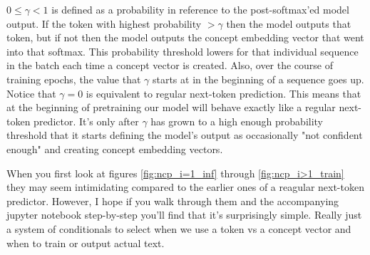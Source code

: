 \documentclass{article}
\begin{document}
$0\leq\gamma<1$ is defined as a probability in reference to the post-softmax'ed model output.
If the token with highest probability $>\gamma$ then the model outputs that token, but if not then the model outputs the concept embedding vector that went into that softmax.
This probability threshold lowers for that individual sequence in the batch each time a concept vector is created.
Also, over the course of training epochs, the value that $\gamma$ starts at in the beginning of a sequence goes up.
Notice that $\gamma=0$ is equivalent to regular next-token prediction.
This means that at the beginning of pretraining our model will behave exactly like a regular next-token predictor.
It's only after $\gamma$ has grown to a high enough probability threshold that it starts defining the model's output as occasionally "not confident enough" and creating concept embedding vectors.\par

When you first look at figures \ref{fig:ncp_i=1_inf} through \ref{fig:ncp_i>1_train} they may seem intimidating compared to the earlier ones of a reagular next-token predictor. However, I hope if you walk through them and the accompanying jupyter notebook step-by-step you'll find that it's surprisingly simple. Really just a system of conditionals to select when we use a token vs a concept vector and when to train or output actual text. 
\end{document}
